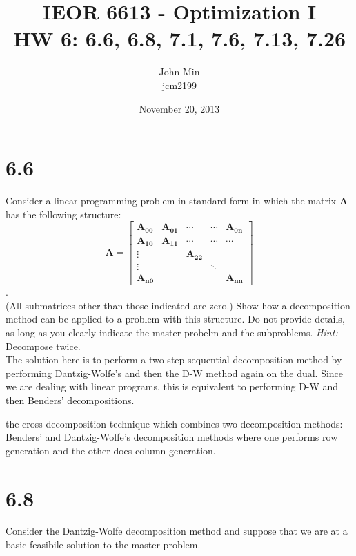\documentclass{article}
\begin{document}
\title{IEOR 6613 - Optimization I\\ HW 6:  6.6, 6.8, 7.1, 7.6, 7.13, 7.26}

\author{John Min\\ jcm2199}
\date{November 20, 2013}
\maketitle

\section*{6.6}
Consider a linear programming problem in standard form in which the matrix $\mathbf{A}$ has the following structure: \\
$$ \mathbf{A = } 
\begin{bmatrix} \mathbf{A_{00}} & \mathbf{A_{01}} & \cdots & \cdots & \mathbf{A_{0n}} \\
				\mathbf{A_{10}} & \mathbf{A_{11}} & \cdots & \cdots & \cdots	\\
				\vdots & & \mathbf{A_{22}} \\
				\vdots & & & \ddots \\
				\mathbf{A_{n0}} & & & & \mathbf{A_{nn}}
\end{bmatrix} $$. \\
(All submatrices other than those indicated are zero.)  Show how a decomposition method can be applied to a problem with this structure.  Do not provide details, as long as you clearly indicate the master probelm and the subproblems.  \emph{Hint:} Decompose twice. \\

\noindent
The solution here is to perform a two-step sequential decomposition method by performing Dantzig-Wolfe's and then the D-W method again on the dual.  Since we are dealing with linear programs, this is equivalent to performing D-W and then Benders' decompositions.


 the cross decomposition technique which combines two decomposition methods:  Benders' and Dantzig-Wolfe's decomposition methods where one performs row generation and the other does column generation.  

\section*{6.8}  
Consider the Dantzig-Wolfe decomposition method and suppose that we are at a basic feasibile solution to the master problem. \\
\end{document}

